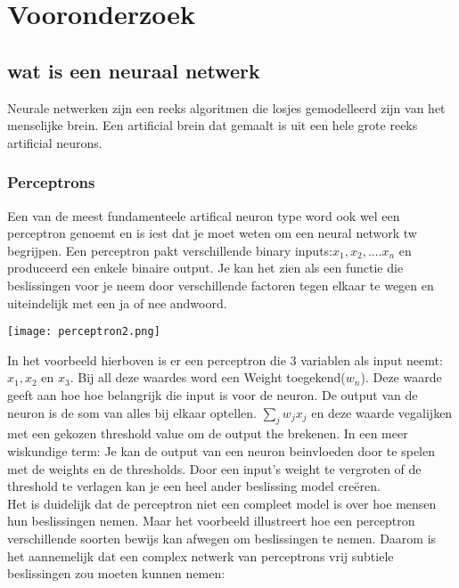 \section{Vooronderzoek}

\subsection{wat is een neuraal netwerk}
Neurale netwerken zijn een reeks algoritmen die losjes gemodelleerd zijn van het menselijke brein. Een artificial brein dat gemaalt is uit een hele grote reeks artificial neurons.

\subsubsection{Perceptrons}
Een van de meest fundamenteele artifical neuron type word ook wel een perceptron genoemt en is iest dat je moet weten om een neural network tw begrijpen. Een perceptron pakt verschillende binary inputs:$x_{1}, x_{2},....x_{n}$ en produceerd een enkele binaire output. Je kan het zien als een functie die beslissingen voor je neem door verschillende factoren tegen elkaar te wegen en uiteindelijk met een ja of nee andwoord.
\begin{center}
\texttt{[image: perceptron2.png]}
\end{center}
In het voorbeeld hierboven is er een perceptron die 3 variablen als input neemt: $x_{1}, x_{2}$ en $x_{3}.$ Bij all deze waardes word een Weight toegekend($w_{n}$). Deze waarde geeft aan hoe hoe belangrijk die input is voor de neuron. De output van de neuron is de som van alles bij elkaar optellen. $\sum_{j}w_{j}x_{j}$ en deze waarde vegalijken met een gekozen threshold value om de output the brekenen. In een meer wiskundige term:
Je kan de output van een neuron beinvloeden door te spelen met de weights en de thresholds.
Door een input's weight te vergroten of de threshold te verlagen kan je een heel ander beslissing model creëren.\\
\newline
Het is duidelijk dat de perceptron niet een compleet model is over hoe mensen hun beslissingen nemen. Maar het voorbeeld illustreert hoe een perceptron verschillende soorten bewijs kan afwegen om beslissingen te nemen. Daarom is het aannemelijk dat een complex netwerk van perceptrons vrij subtiele beslissingen zou moeten kunnen nemen:
